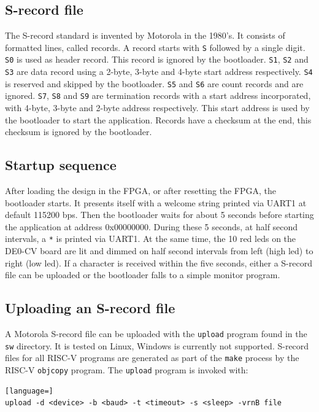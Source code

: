 \documentclass[12pt]{article}
\begin{document}
\subsection{S-record file}
The S-record standard is invented by Motorola in the 1980's. It consists of formatted lines, called records. A record starts with \lstinline|S| followed by a single digit. \lstinline|S0| is used as header record. This record is ignored by the bootloader. \lstinline|S1|,  \lstinline|S2| and \lstinline|S3| are data record using a 2-byte, 3-byte and 4-byte start address respectively. \lstinline|S4| is reserved and skipped by the bootloader. \lstinline|S5| and \lstinline|S6| are count records and are ignored. \lstinline|S7|, \lstinline|S8| and \lstinline|S9| are termination records with a start address incorporated, with 4-byte, 3-byte and 2-byte address respectively. This start address is used by the bootloader to start the application. Records have a checksum at the end, this checksum is ignored by the bootloader.

\subsection{Startup sequence}
After loading the design in the FPGA, or after resetting the FPGA, the bootloader starts. It presents itself with a welcome string printed via UART1 at default 115200 bps. Then the bootloader waits for about 5 seconds before starting the application at address 0x00000000. During these 5 seconds, at half second intervals, a \lstinline|*| is printed via UART1. At the same time, the 10 red leds on the DE0-CV board are lit and dimmed on half second intervals from left (high led) to right (low led). If a character is received within the five seconds, either a S-record file can be uploaded or the bootloader falls to a simple monitor program.

\subsection{Uploading an S-record file}
A Motorola S-record file can be uploaded with the \lstinline|upload| program found in the \lstinline|sw| directory. It is tested on Linux, Windows is currently not supported. S-record files for all RISC-V programs are generated as part of the \lstinline|make| process by the RISC-V \lstinline|objcopy| program. The \lstinline|upload| program is invoked with:

\begin{lstlisting}[language=]
upload -d <device> -b <baud> -t <timeout> -s <sleep> -vrnB file
\end{lstlisting}
\end{document}
